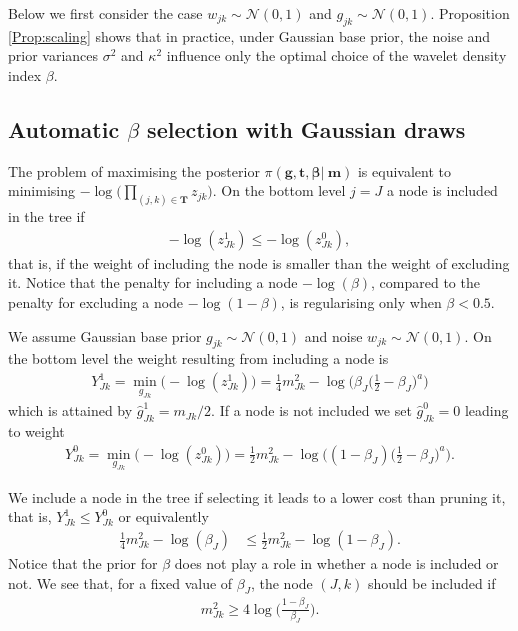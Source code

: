 \documentclass[11pt,a4paper]{article}
\newcommand{\Nn}{{\mathcal N}}
\newcommand{\oT}{\boldsymbol{T}}
\begin{document}
Below we first consider the case $w_{jk}\sim \Nn(0,1)$ and $g_{jk}\sim\Nn(0,1)$. Proposition \ref{Prop:scaling} shows that in practice, under Gaussian base prior, the noise and prior variances $\sigma^2$ and $\kappa^2$ influence only the optimal choice of the wavelet density index $\beta$.

\subsection{Automatic $\beta$ selection with Gaussian draws}\label{Sec:PruningGaussian}

The problem of maximising the posterior $\pi(\boldsymbol{g},\boldsymbol{t},\boldsymbol{\beta} |\ \boldsymbol{m})$ is equivalent to minimising $-\log\big(\prod_{(j,k)\in \oT} z_{jk}\big)$.
On the bottom level $j=J$ a node is included in the tree if 
\begin{align*}
-\log(z^1_{Jk})\leq -\log(z^0_{Jk}),        
\end{align*}
that is, if the weight of including the node is smaller than the weight of excluding it. Notice that the penalty for including a node $-\log(\beta)$, compared to the penalty for excluding a node $-\log(1-\beta)$, is regularising only when $\beta<0.5$.

We assume Gaussian base prior $g_{jk}\sim\Nn(0,1)$ and noise $w_{jk}\sim \Nn(0,1)$. On the bottom level the weight resulting from including a node is
\begin{align*}
Y^1_{Jk}
= \min_{g_{Jk}}\big(-\log(z^1_{Jk})\big)
= \frac{1}{4}m^2_{Jk}-\log\bigg(\beta_J\Big(\frac{1}{2}-\beta_J\Big)^a\bigg)
\end{align*}
which is attained by $\hat{g}^1_{Jk}=m_{Jk}/2$. If a node is not included we set $\hat{g}^0_{Jk}=0$ leading to weight
\begin{align*}
Y^0_{Jk}
= \min_{g_{Jk}}\big(-\log(z^0_{Jk})\big)
= \frac{1}{2}m^2_{Jk}-\log\bigg((1-\beta_J)\Big(\frac{1}{2}-\beta_J\Big)^a\bigg).
\end{align*}

We include a node in the tree if selecting it leads to a lower cost than pruning it, that is, $Y^1_{Jk}\leq Y^0_{Jk}$ or equivalently
\begin{align*}
\frac{1}{4}m^2_{Jk}-\log(\beta_J)
& \leq \frac{1}{2}m^2_{Jk}-\log(1-\beta_J). 
\end{align*}
Notice that the prior for $\beta$ does not play a role in whether a node is included or not. 
We see that, for a fixed value of $\beta_J$, the node $(J,k)$ should be included if 
\begin{align}\label{eq:GaussianChosen}
m_{Jk}^2\geq 4\log\bigg(\frac{1-\beta_J}{\beta_J}\bigg).
\end{align}
\end{document}
